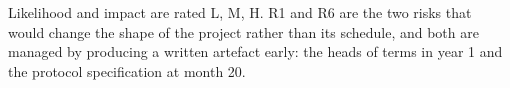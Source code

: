 \vspace{4pt}
\noindent
{\small Likelihood and impact are rated L, M, H. R1 and R6 are the two risks that would change the
shape of the project rather than its schedule, and both are managed by producing a written artefact
early: the heads of terms in year 1 and the protocol specification at month 20.}
